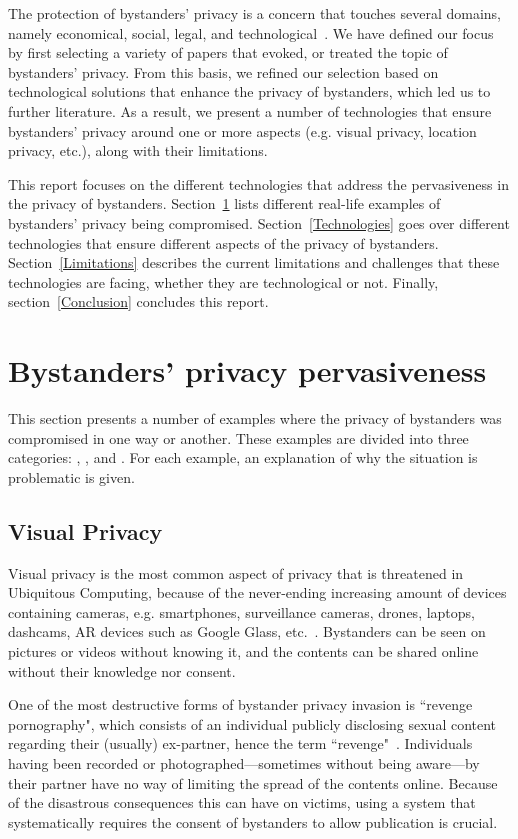 \documentclass[conference, 11pt]{IEEEtran}
\begin{document}
The protection of bystanders' privacy is a concern that touches several domains, namely economical, social, legal, and technological~\cite{lu2017privacy}. We have defined our focus by first selecting a variety of papers that evoked, or treated the topic of bystanders' privacy. From this basis, we refined our selection based on technological solutions that enhance the privacy of bystanders, which led us to further literature. As a result, we present a number of technologies that ensure bystanders' privacy around one or more aspects (e.g. visual privacy, location privacy, etc.), along with their limitations.

This report focuses on the different technologies that address the pervasiveness in the privacy of bystanders. Section~\ref{BystandersPrivacy} lists different real-life examples of bystanders' privacy being compromised. Section~\ref{Technologies} goes over different technologies that ensure different aspects of the privacy of bystanders. Section~\ref{Limitations} describes the current limitations and challenges that these technologies are facing, whether they are technological or not. Finally, section~\ref{Conclusion} concludes this report.

\section{Bystanders’ privacy pervasiveness}\label{BystandersPrivacy}
This section presents a number of examples where the privacy of bystanders was compromised in one way or another. These examples are divided into three categories: , , and . For each example, an explanation of why the situation is problematic is given.

\subsection{Visual Privacy}\label{Videos}
Visual privacy is the most common aspect of privacy that is threatened in Ubiquitous Computing, because of the never-ending increasing amount of devices containing cameras, e.g. smartphones, surveillance cameras, drones, laptops, dashcams, \ac{AR} devices such as Google Glass, etc.~\cite{lu2017privacy, yao2017privacy, chinomi2008PriSurv}. Bystanders can be seen on pictures or videos without knowing it, and the contents can be shared online without their knowledge nor consent. 

One of the most destructive forms of bystander privacy invasion is ``revenge pornography", which consists of an individual publicly disclosing sexual content regarding their (usually) ex-partner, hence the term ``revenge"~\cite{olteanu2018consensual}. Individuals having been recorded or photographed---sometimes without being aware---by their partner have no way of limiting the spread of the contents online. Because of the disastrous consequences this can have on victims, using a system that systematically requires the consent of bystanders to allow publication is crucial.
\end{document}
